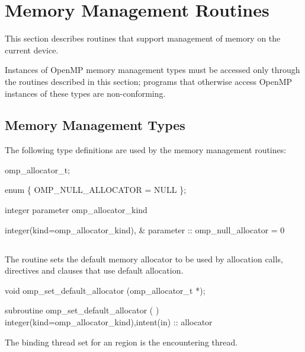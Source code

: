 \section{Memory Management Routines}
\label{sec:Memory Management Routines}
This section describes routines that support management of memory on the current device.

Instances of OpenMP memory management types must be accessed only through the routines described in this section; programs that otherwise access OpenMP instances of these types are non-conforming.

\subsection{Memory Management Types}
\label{subsec:Memory Management Types}

The following type definitions are used by the memory management routines:

\begin{ccppspecific}
\begin{codepar}
omp_allocator_t;

enum \{ OMP_NULL_ALLOCATOR = NULL \};
\end{codepar}
\end{ccppspecific}

\begin{fortranspecific}
\begin{codepar}
integer parameter omp_allocator_kind

integer(kind=omp_allocator_kind), &
        parameter :: omp_null_allocator = 0
\end{codepar}
\end{fortranspecific}

\subsection{}
\label{subsec:omp_set_default_allocator}

\summary
The  routine sets the default memory allocator to be used by allocation calls, directives and clauses that use default allocation.

\format
\ccppspecificstart
\begin{boxedcode}
void omp_set_default_allocator (omp_allocator_t *);
\end{boxedcode}
\ccppspecificend
\fortranspecificstart
\begin{boxedcode}
subroutine omp_set_default_allocator (  )
integer(kind=omp_allocator_kind),intent(in) :: allocator
\end{boxedcode}
\fortranspecificend
\binding
The binding thread set for an  region is the encountering thread.

